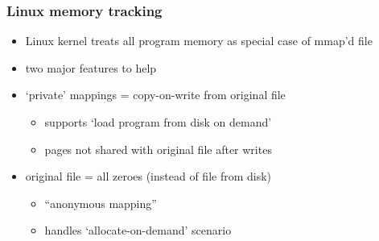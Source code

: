 \usetikzlibrary{arrows.meta,calc,matrix,shapes.misc}

\begin{frame}
\frametitle{Linux memory tracking}
\begin{itemize}
\item Linux kernel treats all program memory as special case of mmap'd file
\vspace{.5cm}
\item two major features to help
\item `private' mappings = copy-on-write from original file
    \begin{itemize}
    \item supports `load program from disk on demand'
    \item pages not shared with original file after writes
    \end{itemize}
\item original file = all zeroes (instead of file from disk)
    \begin{itemize}
    \item ``anonymous mapping''
    \item handles `allocate-on-demand' scenario
    \end{itemize}
\end{itemize}
\end{frame}

